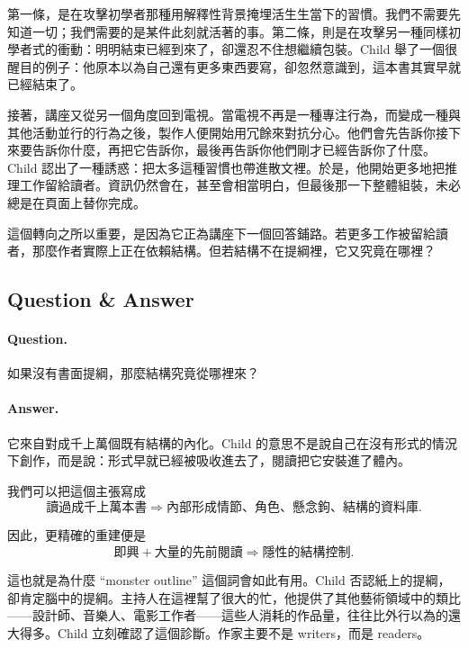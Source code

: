 第一條，是在攻擊初學者那種用解釋性背景掩埋活生生當下的習慣。我們不需要先知道一切；我們需要的是某件此刻就活著的事。第二條，則是在攻擊另一種同樣初學者式的衝動：明明結束已經到來了，卻還忍不住想繼續包裝。Child 舉了一個很醒目的例子：他原本以為自己還有更多東西要寫，卻忽然意識到，這本書其實早就已經結束了。

接著，講座又從另一個角度回到電視。當電視不再是一種專注行為，而變成一種與其他活動並行的行為之後，製作人便開始用冗餘來對抗分心。他們會先告訴你接下來要告訴你什麼，再把它告訴你，最後再告訴你他們剛才已經告訴你了什麼。Child 認出了一種誘惑：把太多這種習慣也帶進散文裡。於是，他開始更多地把推理工作留給讀者。資訊仍然會在，甚至會相當明白，但最後那一下整體組裝，未必總是在頁面上替你完成。

這個轉向之所以重要，是因為它正為講座下一個回答鋪路。若更多工作被留給讀者，那麼作者實際上正在依賴結構。但若結構不在提綱裡，它又究竟在哪裡？

\subsection{Question \& Answer}

\paragraph{Question.} 如果沒有書面提綱，那麼結構究竟從哪裡來？

\paragraph{Answer.} 它來自對成千上萬個既有結構的內化。Child 的意思不是說自己在沒有形式的情況下創作，而是說：形式早就已經被吸收進去了，閱讀把它安裝進了體內。

我們可以把這個主張寫成
\begin{equation}
\text{讀過成千上萬本書} \Longrightarrow \text{內部形成情節、角色、懸念鉤、結構的資料庫}.
\end{equation}

因此，更精確的重建便是
\begin{equation}
\text{即興} + \text{大量的先前閱讀} \Longrightarrow \text{隱性的結構控制}.
\end{equation}

這也就是為什麼 ``monster outline'' 這個詞會如此有用。Child 否認紙上的提綱，卻肯定腦中的提綱。主持人在這裡幫了很大的忙，他提供了其他藝術領域中的類比——設計師、音樂人、電影工作者——這些人消耗的作品量，往往比外行以為的還大得多。Child 立刻確認了這個診斷。作家主要不是 writers，而是 readers。

